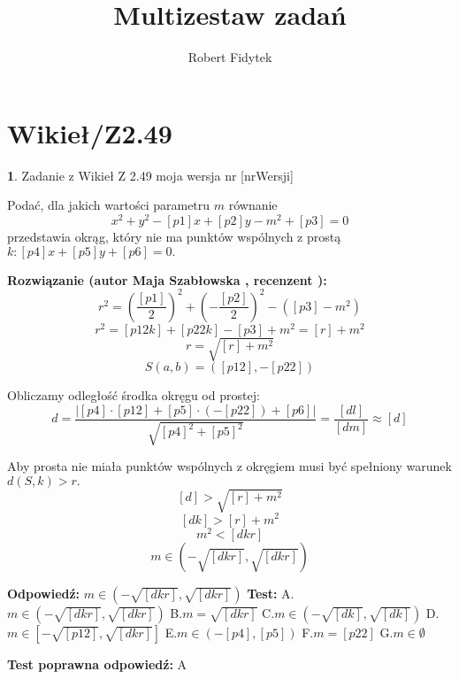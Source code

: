 \documentclass[12pt, a4paper]{article}
\title{Multizestaw zadań}
\author{Robert Fidytek}
\date{}
\theoremstyle{definition} %
\newtheorem{zad}{}
\newcommand{\kategoria}[1]{\section{#1}} %
\newcommand{\zadStart}[1]{\begin{zad}#1\newline} %
\newcommand{\zadStop}{\end{zad}}   %
\newcommand{\rozwStart}[2]{\noindent \textbf{Rozwiązanie (autor #1 , recenzent #2): }\newline} %
\newcommand{\rozwStop}{\newline}                                            %
\newcommand{\odpStart}{\noindent \textbf{Odpowiedź:}\newline}    %
\newcommand{\odpStop}{\newline}                                             %
\newcommand{\testStart}{\noindent \textbf{Test:}\newline} %
\newcommand{\testStop}{\newline} %
\newcommand{\kluczStart}{\noindent \textbf{Test poprawna odpowiedź:}\newline} %
\newcommand{\kluczStop}{\newline} %
\begin{document}
\maketitle


\kategoria{Wikieł/Z2.49}
\zadStart{Zadanie z Wikieł Z 2.49 moja wersja nr [nrWersji]}


Podać, dla jakich wartości parametru $m$ równanie
$$x^{2}+y^{2}-[p1]x+[p2]y-m^{2}+[p3]=0$$
przedstawia okrąg, który nie ma punktów wspólnych z prostą $k: [p4]x+[p5]y+[p6]=0.$

\zadStop

\rozwStart{Maja Szabłowska}{}
$$r^{2}=\left(\frac{[p1]}{2}\right)^{2}+\left(-\frac{[p2]}{2}\right)^{2}-([p3]-m^{2})$$
$$r^{2}=[p12k]+[p22k]-[p3]+m^{2}=[r]+m^{2}$$
$$r=\sqrt{[r]+m^{2}}$$
$$S(a,b)=([p12],-[p22])$$

Obliczamy odległość środka okręgu od prostej:
$$d=\frac{|[p4]\cdot[p12]+[p5]\cdot(-[p22])+[p6]|}{\sqrt{[p4]^{2}+[p5]^{2}}}=\frac{[dl]}{[dm]}\approx [d]$$

Aby prosta nie miała punktów wspólnych z okręgiem musi być spełniony warunek $d(S,k)>r.$
$$[d]>\sqrt{[r]+m^{2}}$$
$$[dk]>[r]+m^{2}$$
$$m^{2}<[dkr]$$
$$m\in(-\sqrt{[dkr]}, \sqrt{[dkr]})$$
\rozwStop


\odpStart
$m\in(-\sqrt{[dkr]}, \sqrt{[dkr]})$
\odpStop
\testStart
A.$m\in(-\sqrt{[dkr]}, \sqrt{[dkr]})$
B.$m=\sqrt{[dkr]}$
C.$m\in(-\sqrt{[dk]}, \sqrt{[dk]})$
D.$m\in[-\sqrt{[p12]}, \sqrt{[dkr]}]$
E.$m\in(-[p4], [p5])$
F.$m=[p22]$
G.$m\in\emptyset$

\testStop
\kluczStart
A
\kluczStop
\end{document}

